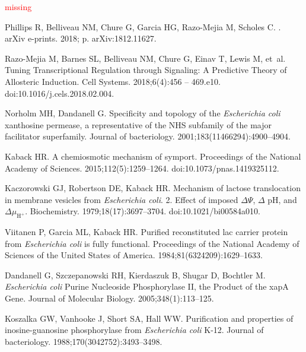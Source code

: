 \documentclass[10pt,letterpaper]{article}
\begin{document}
\textcolor{red}{missing}

\FloatBarrier
\newpage

\begin{thebibliography}{10}
	
	{Phillips} R, {Belliveau} NM, {Chure} G, {Garcia} HG, {Razo-Mejia} M, {Scholes}
	C.
	.
	\newblock arXiv e-prints. 2018; p. arXiv:1812.11627.
	
	Razo-Mejia M, Barnes SL, Belliveau NM, Chure G, Einav T, Lewis M, et~al.
	\newblock Tuning Transcriptional Regulation through Signaling: A Predictive
	Theory of Allosteric Induction.
	\newblock Cell Systems. 2018;6(4):456 -- 469.e10.
	\newblock doi:{10.1016/j.cels.2018.02.004}.
	
	Norholm MH, Dandanell G.
	\newblock Specificity and topology of the \emph{Escherichia coli} xanthosine
	permease, a representative of the NHS subfamily of the major facilitator
	superfamily.
	\newblock Journal of bacteriology. 2001;183(11466294):4900--4904.
	
	Kaback HR.
	\newblock A chemiosmotic mechanism of symport.
	\newblock Proceedings of the National Academy of Sciences.
	2015;112(5):1259--1264.
	\newblock doi:{10.1073/pnas.1419325112}.
	
	Kaczorowski GJ, Robertson DE, Kaback HR.
	\newblock Mechanism of lactose translocation in membrane vesicles from
	\emph{Escherichia coli}. 2. Effect of imposed $\Delta \Psi$, $\Delta$ pH, and
	$\Delta \mu_{\mathrm{H^+}}$.
	\newblock Biochemistry. 1979;18(17):3697--3704.
	\newblock doi:{10.1021/bi00584a010}.
	
	Viitanen P, Garcia ML, Kaback HR.
	\newblock Purified reconstituted lac carrier protein from \emph{Escherichia
		coli} is fully functional.
	\newblock Proceedings of the National Academy of Sciences of the United States
	of America. 1984;81(6324209):1629--1633.
	
	Dandanell G, Szczepanowski RH, Kierdaszuk B, Shugar D, Bochtler M.
	\newblock \emph{Escherichia coli} Purine Nucleoside Phosphorylase II, the
	Product of the xapA Gene.
	\newblock Journal of Molecular Biology. 2005;348(1):113--125.
	
	Koszalka GW, Vanhooke J, Short SA, Hall WW.
	\newblock Purification and properties of inosine-guanosine phosphorylase from
	\emph{Escherichia coli} K-12.
	\newblock Journal of bacteriology. 1988;170(3042752):3493--3498.
	

\end{thebibliography}
\end{document}
